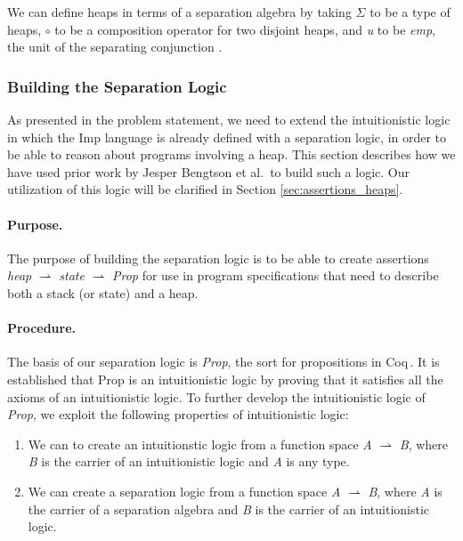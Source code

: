 We can define heaps in terms of a separation algebra by taking $\Sigma$ to be a type of heaps, $\circ$ to be a composition operator for two disjoint heaps, and {\it u} to be {\it emp}, the unit of the separating conjunction \cite{BirkedalL:veroop-conf}.

\subsubsection{Building the Separation Logic}
As presented in the problem statement, we need to extend the intuitionistic logic in which the Imp language is already defined with a separation logic, in order to be able to reason about programs involving a heap. This section describes how we have used prior work by Jesper Bengtson et al.\,\cite{BirkedalL:veroop-conf} to build such a logic. Our utilization of this logic will be clarified in Section \ref{sec:assertions_heaps}.

\paragraph{Purpose.}
The purpose of building the separation logic is to be able to create assertions {\it heap} $\rightharpoonup$ {\it state} $\rightharpoonup$ {\it Prop} for use in program specifications that need to describe both a stack (or state) and a heap.

\paragraph{Procedure.} The basis of our separation logic is {\it Prop}, the sort for propositions in Coq\,\cite{CoqIntro}. 	It is established that Prop is an intuitionistic logic by proving that it satisfies all the axioms of an intuitionistic logic. To further develop the intuitionistic logic of {\it Prop}, we exploit the following properties of intuitionistic logic:

\begin{enumerate}[label=\arabic*)]
\item We can to create an intuitionstic logic from a function space {\it A} $\rightharpoonup$ {\it B}, where {\it B} is the carrier of an intuitionistic logic and {\it A} is any type.
\item We can create a separation logic from a function space {\it A} $\rightharpoonup$ {\it B}, where {\it A} is the carrier of a separation algebra and {\it B} is the carrier of an intuitionistic logic.\,\cite{JBSlides}
\end{enumerate}

